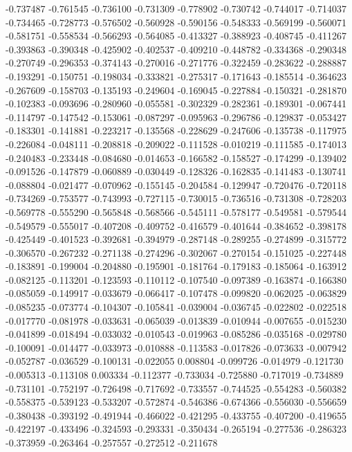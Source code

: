 -0.737487
-0.761545
-0.736100
-0.731309
-0.778902
-0.730742
-0.744017
-0.714037
-0.734465
-0.728773
-0.576502
-0.560928
-0.590156
-0.548333
-0.569199
-0.560071
-0.581751
-0.558534
-0.566293
-0.564085
-0.413327
-0.388923
-0.408745
-0.411267
-0.393863
-0.390348
-0.425902
-0.402537
-0.409210
-0.448782
-0.334368
-0.290348
-0.270749
-0.296353
-0.374143
-0.270016
-0.271776
-0.322459
-0.283622
-0.288887
-0.193291
-0.150751
-0.198034
-0.333821
-0.275317
-0.171643
-0.185514
-0.364623
-0.267609
-0.158703
-0.135193
-0.249604
-0.169045
-0.227884
-0.150321
-0.281870
-0.102383
-0.093696
-0.280960
-0.055581
-0.302329
-0.282361
-0.189301
-0.067441
-0.114797
-0.147542
-0.153061
-0.087297
-0.095963
-0.296786
-0.129837
-0.053427
-0.183301
-0.141881
-0.223217
-0.135568
-0.228629
-0.247606
-0.135738
-0.117975
-0.226084
-0.048111
-0.208818
-0.209022
-0.111528
-0.010219
-0.111585
-0.174013
-0.240483
-0.233448
-0.084680
-0.014653
-0.166582
-0.158527
-0.174299
-0.139402
-0.091526
-0.147879
-0.060889
-0.030449
-0.128326
-0.162835
-0.141483
-0.130741
-0.088804
-0.021477
-0.070962
-0.155145
-0.204584
-0.129947
-0.720476
-0.720118
-0.734269
-0.753577
-0.743993
-0.727115
-0.730015
-0.736516
-0.731308
-0.728203
-0.569778
-0.555290
-0.565848
-0.568566
-0.545111
-0.578177
-0.549581
-0.579544
-0.549579
-0.555017
-0.407208
-0.409752
-0.416579
-0.401644
-0.384652
-0.398178
-0.425449
-0.401523
-0.392681
-0.394979
-0.287148
-0.289255
-0.274899
-0.315772
-0.306570
-0.267232
-0.271138
-0.274296
-0.302067
-0.270154
-0.151025
-0.227448
-0.183891
-0.199004
-0.204880
-0.195901
-0.181764
-0.179183
-0.185064
-0.163912
-0.082125
-0.113201
-0.123593
-0.110112
-0.107540
-0.097389
-0.163874
-0.166380
-0.085059
-0.149917
-0.033679
-0.066417
-0.107478
-0.099820
-0.062025
-0.063829
-0.085235
-0.073774
-0.104307
-0.105841
-0.039004
-0.036745
-0.022802
-0.022518
-0.017770
-0.081978
-0.033631
-0.065039
-0.013839
-0.010944
-0.007655
-0.015230
-0.041899
-0.018494
-0.033032
-0.010543
-0.019963
-0.085286
-0.035168
-0.029780
-0.100091
-0.014477
-0.033973
-0.010888
-0.113583
-0.017826
-0.073633
-0.007942
-0.052787
-0.036529
-0.100131
-0.022055
0.008804
-0.099726
-0.014979
-0.121730
-0.005313
-0.113108
0.003334
-0.112377
-0.733034
-0.725880
-0.717019
-0.734889
-0.731101
-0.752197
-0.726498
-0.717692
-0.733557
-0.744525
-0.554283
-0.560382
-0.558375
-0.539123
-0.533207
-0.572874
-0.546386
-0.674366
-0.556030
-0.556659
-0.380438
-0.393192
-0.491944
-0.466022
-0.421295
-0.433755
-0.407200
-0.419655
-0.422197
-0.433496
-0.324593
-0.293331
-0.350434
-0.265194
-0.277536
-0.286323
-0.373959
-0.263464
-0.257557
-0.272512
-0.211678
